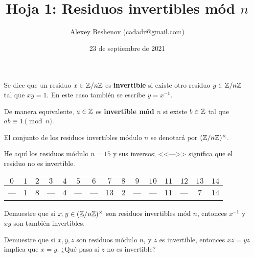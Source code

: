 \documentclass{article}
\title{Hoja 1: Residuos invertibles mód $n$}
\author{Alexey Beshenov (cadadr@gmail.com)}
\date{23 de septiembre de 2021}
\begin{document}
\maketitle
\thispagestyle{empty}

\setcounter{section}{1}

\begin{definicion}
  Se dice que un residuo $x \in \mathbb{Z}/n\mathbb{Z}$ es \textbf{invertible} si existe otro
  residuo $y \in \mathbb{Z}/n\mathbb{Z}$ tal que $xy = 1$. En este caso también se escribe
  $y = x^{-1}$.

  De manera equivalente, $a \in \mathbb{Z}$ es \textbf{invertible mód $n$} si existe
  $b \in \mathbb{Z}$ tal que $ab \equiv 1 \pmod{n}$.
\end{definicion}

El conjunto de los residuos invertibles módulo $n$ se denotará por
$(\mathbb{Z}/n\mathbb{Z})^\times$.

\begin{ejemplo}
  He aquí los residuos módulo $n = 15$ y sus inversos; <<--->> significa que el
  residuo no es invertible.

  \begin{center}
    \begin{tabular}{ccccccccccccccc}
      \hline
      $0$ & $1$ & $2$ & $3$ & $4$ & $5$ & $6$ & $7$ & $8$ & $9$ & $10$ & $11$ & $12$ & $13$ & $14$ \\
      \hline
      --- & $1$ & $8$ & --- & $4$ & --- & --- & $13$ & $2$ & --- & --- & $11$ & --- & $7$ & $14$ \\
      \hline
    \end{tabular}
  \end{center}
\end{ejemplo}

\begin{problema}
  Demuestre que si $x, y \in (\mathbb{Z}/n\mathbb{Z})^\times$ son residuos invertibles mód
  $n$, entonces $x^{-1}$ y $xy$ son también invertibles.
\end{problema}

\begin{problema}[Cancelación]
  Demuestre que si $x,y,z$ son residuos módulo $n$, y $z$ es invertible,
  entonces $xz = yz$ implica que $x = y$. ¿Qué pasa si $z$ no es invertible?
\end{problema}
\end{document}
